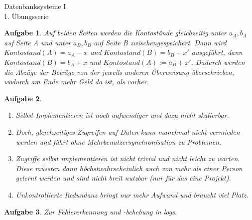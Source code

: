 \documentclass[11pt]{article}
\theoremstyle{break}
\newtheorem{task}{Aufgabe}
\begin{document}
\begin{center}
\Large{Datenbanksysteme I}\\
\large{1. Übungsserie}
\end{center}
\begin{task}
    Auf beiden Seiten werden die Kontostände gleichzeitig unter $a_A,b_A$ auf Seite A und unter $a_B,b_B$ auf Seite B zwischengespeichert. Dann wird $Kontostand(A)=a_A-x$ und $Kontostand(B)=b_B-x'$ ausgeführt, dann $Kontostand(B)=b_A+x$ und $Kontostand(A):= a_B+x'$. Dadurch werden die Abzüge der Beträge von der jeweils anderen Überweisung überschrieben, wodurch am Ende mehr Geld da ist, als vorher.
\end{task}
\begin{task}
    \hfill\vspace{-5mm}
    \begin{enumerate}[label={(\alph*)}]
        \item Selbst Implementieren ist noch aufwendiger und dazu nicht skalierbar.
        \item Doch, gleichzeitiges Zugreifen auf Daten kann manchmal nicht vermieden werden und führt ohne Mehrbenutzersynchronisation zu Problemen.
        \item Zugriffe selbst implementieren ist nicht trivial und nicht leicht zu warten. Diese müssten dann höchstwahrscheinlich auch von mehr als einer Person gelernt werden und sind nicht breit nutzbar (nur für das eine Projekt).
        \item Unkontrollierte Redundanz bringt nur mehr Aufwand und braucht viel Platz.
    \end{enumerate}
\end{task}
\begin{task}
    Zur Fehlererkennung und -behebung in logs.
\end{task}
\end{document}
